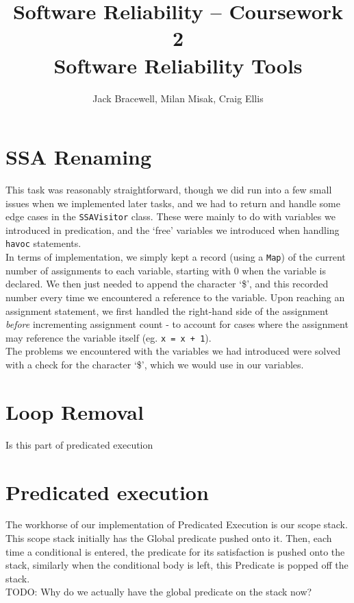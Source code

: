 \documentclass[11pt]{article}
\title{Software Reliability -- Coursework 2 \\ Software Reliability Tools}
\author{Jack Bracewell, Milan Misak, Craig Ellis}
\date{}
\begin{document}
\maketitle

\section{SSA Renaming}

This task was reasonably straightforward, though we did run into a few small issues when we implemented later
tasks, and we had to return and handle some edge cases in the \verb|SSAVisitor| class. These were mainly to do
with variables we introduced in predication, and the `free' variables we introduced when handling \verb|havoc|
statements. \\

In terms of implementation, we simply kept a record (using a \verb|Map|) of the current number of assignments to
each variable, starting with 0 when the variable is declared. We then just needed to append the character `\$',
and this recorded number every time we encountered a reference to the variable. Upon reaching an assignment
statement, we first handled the right-hand side of the assignment \emph{before} incrementing assignment count -
to account for cases where the assignment may reference the variable itself (eg. \verb|x = x + 1|). \\

The problems we encountered with the variables we had introduced were solved with a check for the character `\$',
which we would use in our variables.

\section{Loop Removal}
Is this part of predicated execution
\section{Predicated execution}
The workhorse of our implementation of Predicated Execution is our scope stack. This scope stack initially
has the Global predicate pushed onto it. Then, each time a conditional is entered, the predicate for its
satisfaction is pushed onto the stack, similarly when the conditional body is left, this Predicate is
popped off the stack.\\

TODO: Why do we actually have the global predicate on the stack now?
\end{document}
